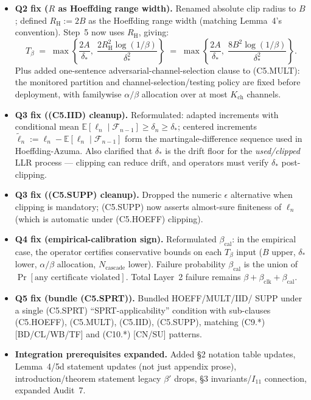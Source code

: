 \documentclass{article}
\newcommand{\deltastar}{\delta_{*}}
\newcommand{\Tbeta}{T_{\beta}}
\newcommand{\Ncasc}{N_{\mathrm{cascade}}}
\newcommand{\bclk}{\beta_{\mathrm{clk}}}
\newcommand{\bcal}{\beta_{\mathrm{cal}}}
\newcommand{\Bclip}{B}
\newcommand{\Rh}{R_{\mathrm{H}}}
\newcommand{\Kch}{K_{\mathrm{ch}}}
\begin{document}
\begin{itemize}
\item \textbf{Q2 fix ($R$ as Hoeffding range width).}  Renamed
  absolute clip radius to $\Bclip$; defined $\Rh := 2\Bclip$ as
  the Hoeffding range width (matching Lemma~4's convention).
  Step~5 now uses $\Rh$, giving:
  \[
    \Tbeta \;=\; \max\!\left\{\frac{2A}{\deltastar},\;
    \frac{2 \Rh^2 \log(1/\beta)}{\deltastar^2}\right\}
    \;=\; \max\!\left\{\frac{2A}{\deltastar},\;
    \frac{8 \Bclip^2 \log(1/\beta)}{\deltastar^2}\right\}.
  \]
  Plus added one-sentence adversarial-channel-selection clause to
  (C5.MULT): the monitored partition and channel-selection/testing
  policy are fixed before deployment, with familywise
  $\alpha/\beta$ allocation over at most $\Kch$ channels.
\item \textbf{Q3 fix ((C5.IID) cleanup).}  Reformulated: adapted
  increments with conditional mean
  $\mathbb{E}[\ell_n \mid \mathcal{F}_{n-1}] \geq \delta_n \geq
  \deltastar$; centered increments
  $\tilde \ell_n := \ell_n - \mathbb{E}[\ell_n \mid \mathcal{F}_{n-1}]$
  form the martingale-difference sequence used in
  Hoeffding-Azuma.  Also clarified that $\deltastar$ is the
  drift floor for the \emph{used/clipped} LLR process — clipping
  can reduce drift, and operators must verify $\deltastar$ post-
  clipping.
\item \textbf{Q3 fix ((C5.SUPP) cleanup).}  Dropped the numeric
  $\epsilon$ alternative when clipping is mandatory; (C5.SUPP) now
  asserts almost-sure finiteness of $\ell_n$ (which is automatic
  under (C5.HOEFF) clipping).
\item \textbf{Q4 fix (empirical-calibration sign).}  Reformulated
  $\bcal$: in the empirical case, the operator certifies
  conservative bounds on each $\Tbeta$ input ($\Bclip$ upper,
  $\deltastar$ lower, $\alpha/\beta$ allocation, $\Ncasc$ lower).
  Failure probability $\bcal$ is the union of
  $\Pr[\text{any certificate violated}]$.  Total Layer~2 failure
  remains $\beta + \bclk + \bcal$.
\item \textbf{Q5 fix (bundle (C5.SPRT)).}  Bundled HOEFF/MULT/IID/
  SUPP under a single (C5.SPRT) ``SPRT-applicability'' condition
  with sub-clauses (C5.HOEFF), (C5.MULT), (C5.IID), (C5.SUPP),
  matching (C9.*) [BD/CL/WB/TF] and (C10.*) [CN/SU] patterns.
\item \textbf{Integration prerequisites expanded.}  Added §2
  notation table updates, Lemma~4/5d statement updates (not just
  appendix prose), introduction/theorem statement legacy $\beta'$
  drops, §3 invariants/$I_{11}$ connection, expanded Audit~7.
\end{itemize}
\end{document}

